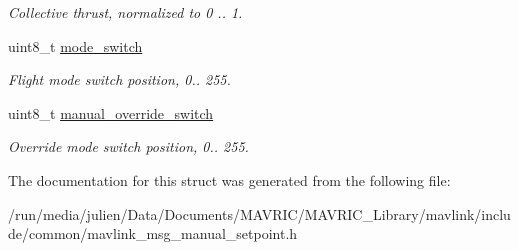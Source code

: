 \begin{DoxyCompactItemize}
\begin{DoxyCompactList}\small\item\em Collective thrust, normalized to 0 .. 1. \end{DoxyCompactList}\item 
\hypertarget{struct____mavlink__manual__setpoint__t_ac3e1509a46421fac372fc2e917b85c1c}{uint8\+\_\+t \hyperlink{struct____mavlink__manual__setpoint__t_ac3e1509a46421fac372fc2e917b85c1c}{mode\+\_\+switch}}\label{struct____mavlink__manual__setpoint__t_ac3e1509a46421fac372fc2e917b85c1c}

\begin{DoxyCompactList}\small\item\em Flight mode switch position, 0.. 255. \end{DoxyCompactList}\item 
\hypertarget{struct____mavlink__manual__setpoint__t_ac32326ac4f3f6983bfc36717d432643f}{uint8\+\_\+t \hyperlink{struct____mavlink__manual__setpoint__t_ac32326ac4f3f6983bfc36717d432643f}{manual\+\_\+override\+\_\+switch}}\label{struct____mavlink__manual__setpoint__t_ac32326ac4f3f6983bfc36717d432643f}

\begin{DoxyCompactList}\small\item\em Override mode switch position, 0.. 255. \end{DoxyCompactList}\end{DoxyCompactItemize}


The documentation for this struct was generated from the following file\+:\begin{DoxyCompactItemize}
\item 
/run/media/julien/\+Data/\+Documents/\+M\+A\+V\+R\+I\+C/\+M\+A\+V\+R\+I\+C\+\_\+\+Library/mavlink/include/common/mavlink\+\_\+msg\+\_\+manual\+\_\+setpoint.\+h\end{DoxyCompactItemize}
